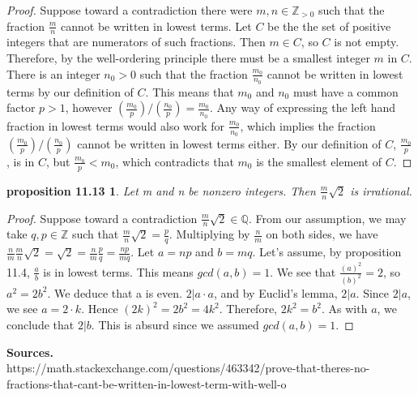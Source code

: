 \documentclass[12pt]{amsart}
\newcommand{\Z}{\mathbb{Z}}
\newcommand{\Q}{\mathbb{Q}}
\begin{document}
\begin{proof}
	Suppose toward a contradiction there were $m,n \in \Z_{>0}$ such that the fraction $\frac{m}{n}$ cannot be written in lowest terms. Let $C$ be the the set of positive integers that are numerators of such fractions. Then $m \in C$, so $C$ is not empty. Therefore, by the well-ordering principle there must be a smallest integer $m$ in $C$. There is an integer $n_0 > 0$ such that the fraction $\frac{m_0}{n_0}$ cannot be written in lowest terms by our definition of $C$. This means that $m_0$ and $n_0$ must have a common factor $p > 1$, however $(\frac{m_0}{p})/(\frac{n_0}{p}) = \frac{m_0}{n_0}$. Any way of expressing the left hand fraction in lowest terms would also work for $\frac{m_0}{n_0}$, which implies the fraction $(\frac{m_0}{p})/(\frac{n_0}{p})$ cannot be written in lowest terms either. By our definition of $C$, $\frac{m_0}{p}$, is in $C$, but $\frac{m_0}{p} < m_0$, which contradicts that $m_0$ is the smallest element of $C$.
\end{proof}

\newtheorem*{prop11.13}{proposition 11.13}
\begin{prop11.13}
	Let m and n be nonzero integers. Then $\frac{m}{n}\sqrt{2}$ is irrational.
\end{prop11.13}

\begin{proof}
	Suppose toward a contradiction $\frac{m}{n}\sqrt{2} \in \Q$. From our assumption, we may take $q,p \in \Z$ such that $\frac{m}{n}\sqrt{2} = \frac{p}{q}$. Multiplying by $\frac{n}{m}$ on both sides, we have $\frac{n}{m}\frac{m}{n}\sqrt{2} = \sqrt{2} = \frac{n}{m}\frac{p}{q}=\frac{np}{mq}$. Let $a = np $ and $b = mq$. Let's assume, by proposition 11.4, $\frac{a}{b}$ is in lowest terms. This means $gcd(a,b)=1$. We see that $\frac{(a)^2}{(b)^2} = 2$, so $a^2 = 2b^2$. We deduce that a is even. $2 | a \cdot a$, and by Euclid's lemma, $2 | a$. Since $2 | a$, we see $a = 2 \cdot k$. Hence $(2k)^2 = 2b^2 = 4k^2$. Therefore, $2k^2 = b^2$. As with $a$, we conclude that $2 | b$. This is absurd since we assumed $gcd(a,b) = 1$.
\end{proof}

\textbf{Sources.}
\\https://math.stackexchange.com/questions/463342/prove-that-theres-no-fractions-that-cant-be-written-in-lowest-term-with-well-o
\end{document}
